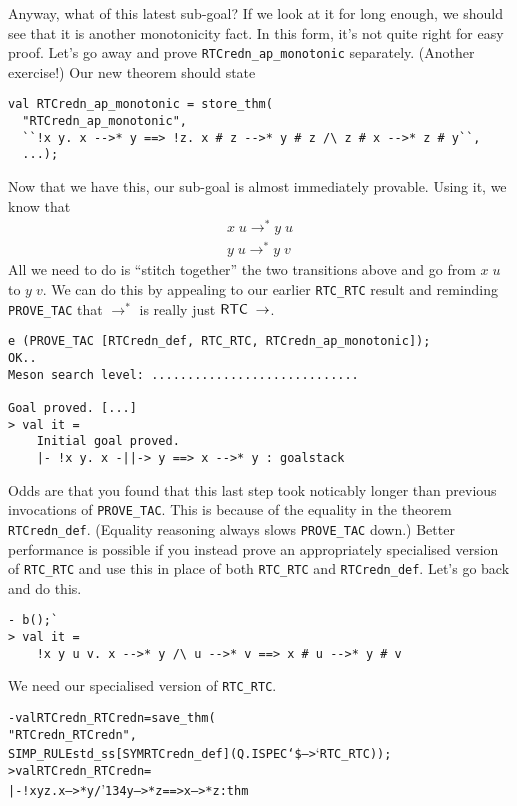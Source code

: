 \documentclass[12pt]{article}
\newcommand{\bk}{\char'134}
\begin{document}
    Anyway, what of this latest sub-goal?  If we look at it for long
    enough, we should see that it is another monotonicity fact.  In
    this form, it's not quite right for easy proof.  Let's go away and
    prove \texttt{RTCredn\_ap\_monotonic} separately. (Another
    exercise!)  Our new theorem should state
\begin{session}\begin{verbatim}
val RTCredn_ap_monotonic = store_thm(
  "RTCredn_ap_monotonic",
  ``!x y. x -->* y ==> !z. x # z -->* y # z /\ z # x -->* z # y``,
  ...);
\end{verbatim}\end{session}
    Now that we have this, our sub-goal is almost immediately
    provable.  Using it, we know that \[\begin{array}{c}
      x\;u \rightarrow^* y\;u \\
      y\;u \rightarrow^* y\;v
    \end{array}\]
    All we need to do is ``stitch together'' the two transitions above
    and go from $x\;u$ to $y\;v$.  We can do this by appealing to our
    earlier \texttt{RTC\_RTC} result and reminding \texttt{PROVE\_TAC}
    that $\rightarrow^*$ is really just
    ${\sf RTC}\;\rightarrow$.
\begin{session}\begin{verbatim}
e (PROVE_TAC [RTCredn_def, RTC_RTC, RTCredn_ap_monotonic]);
OK..
Meson search level: .............................

Goal proved. [...]
> val it =
    Initial goal proved.
    |- !x y. x -||-> y ==> x -->* y : goalstack
\end{verbatim}\end{session}
Odds are that you found that this last step took noticably longer than
previous invocations of \texttt{PROVE\_TAC}.  This is because of the
equality in the theorem \texttt{RTCredn\_def}.  (Equality reasoning
always slows \texttt{PROVE\_TAC} down.) Better performance is possible
if you instead prove an appropriately specialised version of
\texttt{RTC\_RTC} and use this in place of both \texttt{RTC\_RTC} and
\texttt{RTCredn\_def}.  Let's go back and do this.
\begin{session}\begin{verbatim}
- b();`
> val it =
    !x y u v. x -->* y /\ u -->* v ==> x # u -->* y # v
\end{verbatim}\end{session}
We need our specialised version of \texttt{RTC\_RTC}.
\begin{session}\begin{alltt}
- val RTCredn_RTCredn = save_thm(
    "RTCredn_RTCredn",
    SIMP_RULE std_ss [SYM RTCredn_def] (Q.ISPEC `\$-->` RTC_RTC));
> val RTCredn_RTCredn =
    |- !x y z. x -->* y /\bk{} y -->* z ==> x -->* z : thm
\end{alltt}\end{session}
\end{document}

